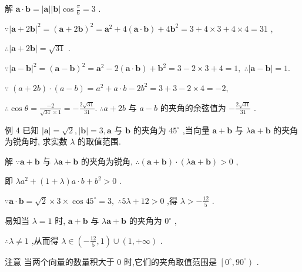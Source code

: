 \documentclass[10pt]{article}
\begin{document}
解 \(\mathbf{a} \cdot  \mathbf{b} = \left| \mathbf{a}\right| \left| \mathbf{b}\right| \cos \frac{\pi }{6} = 3\) .

\(\because {\left| \mathbf{a} + 2\mathbf{b}\right| }^{2} = {\left( \mathbf{a} + 2\mathbf{b}\right) }^{2} = {\mathbf{a}}^{2} + 4\left( {\mathbf{a} \cdot  \mathbf{b}}\right)  + 4{\mathbf{b}}^{2} = 3 + 4 \times  3 + 4 \times  4 = {31}\) ,

\(\therefore \left| {\mathbf{a} + 2\mathbf{b}}\right|  = \sqrt{31}\) .

\(\because {\left| \mathbf{a} - \mathbf{b}\right| }^{2} = {\left( \mathbf{a} - \mathbf{b}\right) }^{2} = {\mathbf{a}}^{2} - 2\left( {\mathbf{a} \cdot  \mathbf{b}}\right)  + {\mathbf{b}}^{2} = 3 - 2 \times  3 + 4 = 1,\;\therefore \left| {\mathbf{a} - \mathbf{b}}\right|  = 1.\)

\(\because \;\left( {a + {2b}}\right)  \cdot  \left( {a - b}\right)  = {a}^{2} + a \cdot  b - 2{b}^{2} = 3 + 3 - 2 \times  4 =  - 2,\)

\(\therefore \cos \theta  = \frac{-2}{\sqrt{31} \times  1} =  - \frac{2\sqrt{31}}{31}.\;\therefore a + {2b}\) 与 \(a - b\) 的夹角的余弦值为 \(- \frac{2\sqrt{31}}{31}\) .

例 4 已知 \(\left| \mathbf{a}\right|  = \sqrt{2},\left| \mathbf{b}\right|  = 3,\mathbf{a}\) 与 \(\mathbf{b}\) 的夹角为 \({45}^{ \circ  }\) ,当向量 \(\mathbf{a} + \mathbf{b}\) 与 \(\lambda \mathbf{a} + \mathbf{b}\) 的夹角为锐角时, 求实数 \(\lambda\) 的取值范围.

解 \(\because \mathbf{a} + \mathbf{b}\) 与 \(\lambda \mathbf{a} + \mathbf{b}\) 的夹角为锐角, \(\therefore \left( {\mathbf{a} + \mathbf{b}}\right)  \cdot  \left( {\lambda \mathbf{a} + \mathbf{b}}\right)  > 0\) ,

即 \(\lambda {a}^{2} + \left( {1 + \lambda }\right) a \cdot  b + {b}^{2} > 0\) .

\(\because \mathbf{a} \cdot  \mathbf{b} = \sqrt{2} \times  3 \times  \cos {45}^{ \circ  } = 3,\;\therefore {5\lambda } + {12} > 0\) ,得 \(\lambda  >  - \frac{12}{5}\) .

易知当 \(\lambda  = 1\) 时, \(\mathbf{a} + \mathbf{b}\) 与 \(\lambda \mathbf{a} + \mathbf{b}\) 的夹角为 \({0}^{ \circ  }\) ,

\(\therefore \lambda  \neq  1\) ,从而得 \(\lambda  \in  \left( {-\frac{12}{5},1}\right)  \cup  \left( {1, + \infty }\right)\) .

注意 当两个向量的数量积大于 0 时,它们的夹角取值范围是 \(\left\lbrack  {{0}^{ \circ  },{90}^{ \circ  }}\right)\) .
\end{document}
